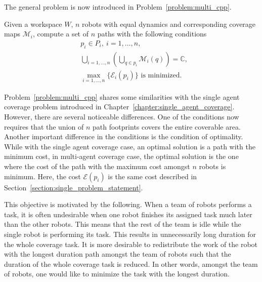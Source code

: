 \documentclass[../main.tex]{subfiles}
\begin{document}

The general problem is now introduced in Problem~\ref{problem:multi_cpp}.
\begin{problem}
\label{problem:multi_cpp}
	Given a workspace $W$, $n$ robots with equal dynamics and corresponding coverage maps $\mathcal{M}_i$, compute a set of $n$ paths with the following conditions
	\begin{equation}
	\begin{aligned}
		& p_i\in P_{i},\ i=1,\dots,n,\\
		& \bigcup_{i=1,\dots,n}(\bigcup_{q\in p_i}\mathcal{M}_i(q))=\mathbb{C},\\
		& \max_{i=1,\ldots,n}\{\mathcal{E}_i(p_i)\}\text{ is minimized.}
	\end{aligned}
	\end{equation}
\end{problem}

Problem~\ref{problem:multi_cpp} shares some similarities with the single agent coverage problem introduced in Chapter~\ref{chapter:single_agent_coverage}. However, there are several noticeable differences. One of the conditions now requires that the union of $n$ path footprints covers the entire coverable area. Another important difference in the conditions is the condition of optimality. While with the single agent coverage case, an optimal solution is a path with the minimum cost, in multi-agent coverage case, the optimal solution is the one where the cost of the path with the maximum cost amongst $n$ robots is minimum. Here, the cost $\mathcal{E}(p_i)$ is the same cost described in Section~\ref{section:single_problem_statement}.

This objective is motivated by the following. When a team of robots performs a task, it is often undesirable when one robot finishes its assigned task much later than the other robots. This means that the rest of the team is idle while the single robot is performing its task. This results in unnecessarily long duration for the whole coverage task. It is more desirable to redistribute the work of the robot with the longest duration path amongst the team of robots such that the duration of the whole coverage task is reduced. In other words, amongst the team of robots, one would like to minimize the task with the longest duration.
\end{document}
